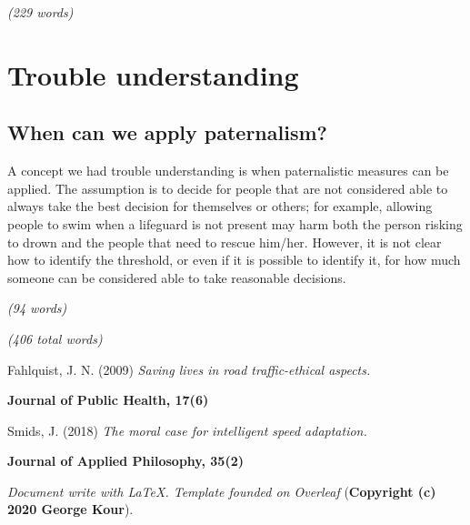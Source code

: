 \emph{(229 words)}

\section{Trouble understanding}
\subsection{When can we apply paternalism?}
A concept we had trouble understanding is when paternalistic measures can be applied. The assumption is to decide for people that are not considered able to always take the best decision for themselves or others; for example, allowing people to swim when a lifeguard is not present may harm both the person risking to drown and the people that need to rescue him/her.
However, it is not clear how to identify the threshold, or even if it is possible to identify it, for how much someone can be considered able to take reasonable decisions.

\emph{(94 words)}

\emph{(406 total words)}

\newpage
\begin{thebibliography}{99}

Fahlquist, J. N. (2009)
\textit{Saving lives in road traffic-ethical aspects.}

\textbf{Journal of Public Health, 17(6)}

Smids, J. (2018)
\textit{The moral case for intelligent speed adaptation.}

\textbf{Journal of Applied Philosophy, 35(2)}

\end{thebibliography}

\textit{Document write with \LaTeX. Template founded on Overleaf} (\textbf{Copyright (c) 2020 George Kour}).